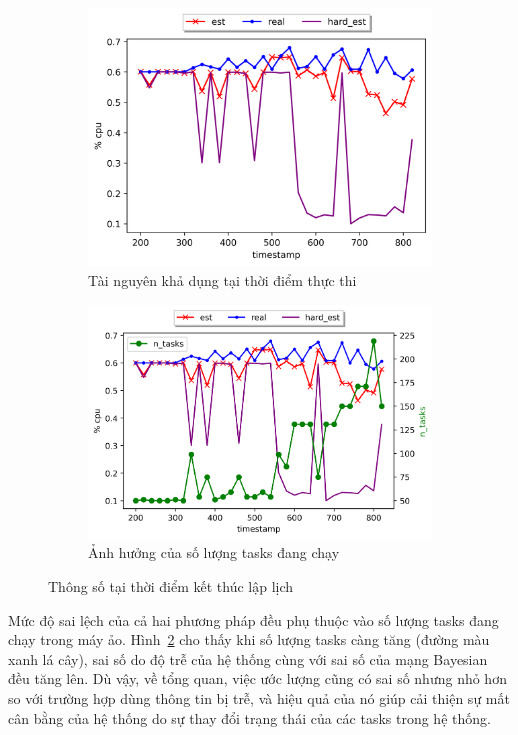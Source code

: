 \documentclass{my_style}
\begin{document}
\begin{figure}[t]
\centering
\begin{subfigure}{.5\textwidth}
  \centering
  \includegraphics[width=.85\linewidth]{images/cpu_usage_estimation_1.png}
  \caption{Tài nguyên khả dụng tại thời điểm thực thi}
  \label{fig:usage_est_a}
\end{subfigure}%
\begin{subfigure}{.5\textwidth}
  \centering
  \includegraphics[width=.9\linewidth]{images/cpu_usage_estimation_2.png}
  \caption{Ảnh hưởng của số lượng tasks đang chạy}
  \label{fig:usage_est_b}
\end{subfigure}
\caption{Thông số tại thời điểm kết thúc lập lịch}
\label{fig:usage_est}
\end{figure}

\noindent
Mức độ sai lệch của cả hai phương pháp đều phụ thuộc vào số lượng tasks đang chạy trong máy ảo. Hình~\ref{fig:usage_est_b} cho thấy khi số lượng tasks càng tăng (đường màu xanh lá cây), sai số do độ trễ của hệ thống cùng với sai số của mạng Bayesian đều tăng lên. Dù vậy, về tổng quan, việc ước lượng cũng có sai số nhưng nhỏ hơn so với trường hợp dùng thông tin bị trễ, và hiệu quả của nó giúp cải thiện sự mất cân bằng của hệ thống do sự thay đổi trạng thái của các tasks trong hệ thống. 
\end{document}
